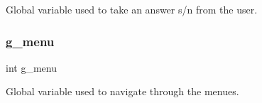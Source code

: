 Global variable used to take an answer s/n from the user. \mbox{\label{group__system_ga9e0d209810483b5853d1a8215eb45f03}} 
\subsubsection{\texorpdfstring{g\+\_\+menu}{g\_menu}}
{\footnotesize\ttfamily int g\+\_\+menu}

Global variable used to navigate through the menues. 